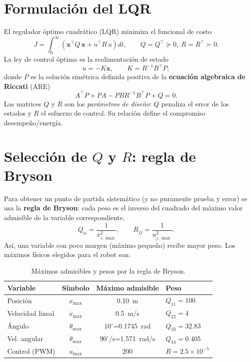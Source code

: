 \documentclass[11pt,a4paper]{article}
\begin{document}
\section{Formulaci\'on del LQR}
El regulador \'optimo cuadr\'atico (LQR) minimiza el funcional de costo
\begin{equation}
J=\int_{0}^{\infty}\!\left(\mathbf{x}^{\top}Q\,\mathbf{x}+u^{\top}R\,u\right)dt,
\qquad Q=Q^{\top}\succeq 0,\ R=R^{\top}\succ 0.
\end{equation}
La ley de control \'optima es la realimentaci\'on de estado
\begin{equation}
u=-K\mathbf{x}, \qquad K=R^{-1}B^{\top}P,
\end{equation}
donde $P$ es la soluci\'on sim\'etrica definida positiva de la
\textbf{ecuaci\'on algebraica de Riccati} (ARE)
\begin{equation}
A^{\top}P+PA-PBR^{-1}B^{\top}P+Q=0.
\end{equation}
Las matrices $Q$ y $R$ son los \emph{par\'ametros de dise\~no}: $Q$ penaliza el
error de los estados y $R$ el esfuerzo de control. Su relaci\'on define el
compromiso desempe\~no/energ\'ia.

\section{Selecci\'on de $Q$ y $R$: regla de Bryson}
Para obtener un punto de partida sistem\'atico (y no puramente prueba y error) se
usa la \textbf{regla de Bryson}: cada peso es el inverso del cuadrado del
m\'aximo valor admisible de la variable correspondiente,
\begin{equation}
Q_{ii}=\frac{1}{x_{i,\max}^{2}}, \qquad R_{jj}=\frac{1}{u_{j,\max}^{2}}.
\end{equation}
As\'i, una variable con poco margen (m\'aximo peque\~no) recibe mayor peso. Los
m\'aximos f\'isicos elegidos para el robot son:

\begin{table}[h]\centering
\begin{tabular}{lccl}
\toprule
Variable & S\'imbolo & M\'aximo admisible & Peso \\
\midrule
Posici\'on        & $x_{\max}$        & 0.10~m      & $Q_{11}=100$ \\
Velocidad lineal  & $\dot{x}_{\max}$  & 0.5~m/s     & $Q_{22}=4$ \\
\'Angulo          & $\theta_{\max}$   & $10^\circ$=0.1745~rad & $Q_{33}=32.83$ \\
Vel. angular      & $\dot{\theta}_{\max}$ & $90^\circ$/s=1.571~rad/s & $Q_{44}=0.405$ \\
Control (PWM)     & $u_{\max}$        & 200               & $R=2.5\times10^{-5}$ \\
\bottomrule
\end{tabular}
\caption{M\'aximos admisibles y pesos por la regla de Bryson.}
\end{table}
\end{document}
